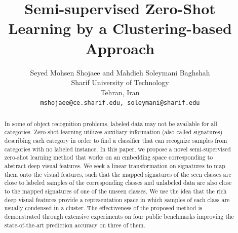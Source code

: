 \documentclass[letterpaper]{article}
\begin{document}
%
\title{Semi-supervised Zero-Shot Learning by a Clustering-based Approach}
 \author{Seyed Mohsen Shojaee {\normalfont and} Mahdieh Soleymani Baghshah\\
 Sharif University of Technology \\
 Tehran, Iran\\
 {\tt\small mshojaee@ce.sharif.edu, soleymani@sharif.edu}
 }

\maketitle

\begin{abstract}
In some of object recognition problems, labeled data may not be available for all categories.
 Zero-shot learning utilizes auxiliary information (also called signatures)
 describing each category in order to find a classifier that can recognize samples
from categories with no labeled instance. %
In this paper, we propose a novel semi-supervised zero-shot learning method that works on an embedding space corresponding to
abstract deep visual features. We seek a linear transformation on signatures to map them onto the visual features,
such that the mapped signatures of the seen classes are close to labeled samples of the corresponding
classes and unlabeled data are also close to the mapped signatures of one of the unseen classes.
 We use the idea that the rich deep visual features provide a representation
 space in which samples of each class are usually condensed in a cluster. The effectiveness of the proposed method is demonstrated through extensive
experiments on four public benchmarks improving the state-of-the-art prediction accuracy on three of them.
\end{abstract}
\end{document}
